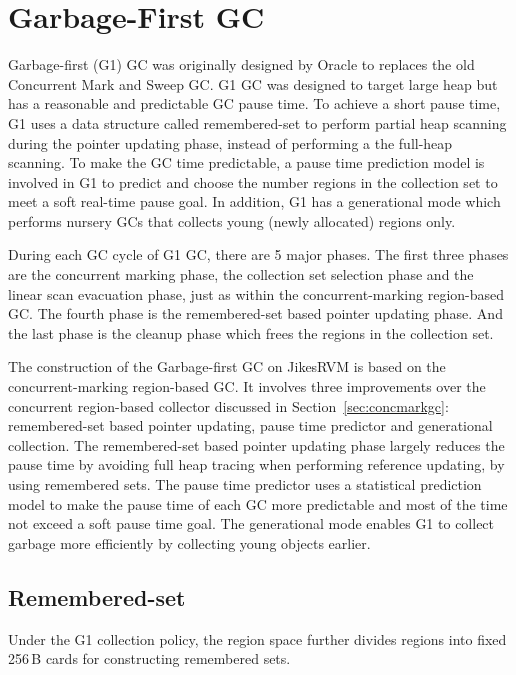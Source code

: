 \section{Garbage-First GC}
\label{sec:g1gc}

Garbage-first (G1) GC \citep{detlefs2004garbage} was originally designed by Oracle to replaces
the old Concurrent Mark and Sweep GC. G1 GC was designed to target large heap but
has a reasonable and predictable GC pause time. To achieve a short pause time, G1
uses a data structure called remembered-set to perform partial heap scanning during the
pointer updating phase, instead of performing a the full-heap scanning. To make the GC time predictable,
a pause time prediction model is involved in G1 to predict and choose the number regions in the
collection set to meet a soft real-time pause goal. In addition, G1 has a generational
mode which performs nursery GCs that collects young (newly allocated) regions only.

During each GC cycle of G1 GC, there are 5 major phases.
The first three phases are the concurrent marking phase, the collection
set selection phase and the linear scan evacuation phase,
just as within the concurrent-marking region-based GC.
The fourth phase is the remembered-set based pointer updating phase.
And the last phase is the cleanup phase which frees the regions in the collection set.

The construction of the Garbage-first GC on JikesRVM is based on the concurrent-marking
region-based GC.
It involves three improvements over the concurrent region-based collector discussed in Section~\ref{sec:concmarkgc}:
remembered-set based pointer updating, pause time predictor and generational collection.
The remembered-set based pointer updating phase largely reduces the pause time by
avoiding full heap tracing when performing reference updating, by using remembered sets.
The pause time predictor uses a statistical prediction model to make the pause time of each
GC more predictable and most of the time not exceed a soft pause time goal.
The generational mode enables G1 to collect garbage more efficiently by collecting young objects earlier.

\subsection{Remembered-set}

Under the G1 collection policy, the region space further divides regions into fixed 256\,B cards for constructing remembered sets.

